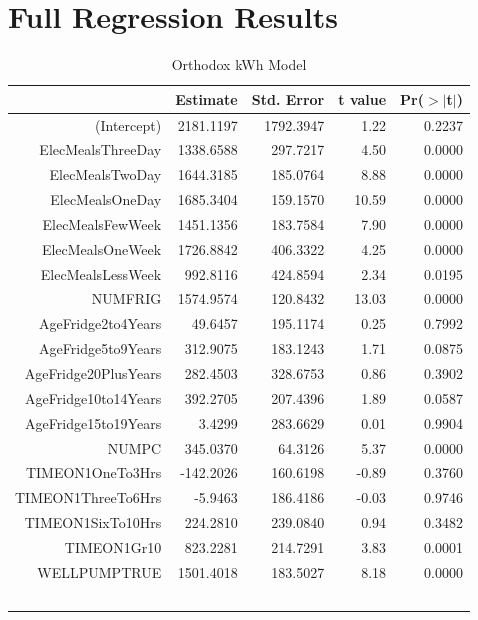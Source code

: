 \documentclass{article}
\begin{document}
\cite{boot}
\nocite{*}
 


\appendix
\section{Full Regression Results}\label{OrthResults}


{\small
\begin{longtable}{rrrrr}
\caption{Orthodox kWh Model} \\ 
  \hline
 & Estimate & Std. Error & t value & Pr($>$$|$t$|$) \\ 
  \hline
(Intercept) & 2181.1197 & 1792.3947 & 1.22 & 0.2237 \\ 
  ElecMealsThreeDay & 1338.6588 & 297.7217 & 4.50 & 0.0000 \\ 
  ElecMealsTwoDay & 1644.3185 & 185.0764 & 8.88 & 0.0000 \\ 
  ElecMealsOneDay & 1685.3404 & 159.1570 & 10.59 & 0.0000 \\ 
  ElecMealsFewWeek & 1451.1356 & 183.7584 & 7.90 & 0.0000 \\ 
  ElecMealsOneWeek & 1726.8842 & 406.3322 & 4.25 & 0.0000 \\ 
  ElecMealsLessWeek & 992.8116 & 424.8594 & 2.34 & 0.0195 \\ 
  NUMFRIG & 1574.9574 & 120.8432 & 13.03 & 0.0000 \\ 
  AgeFridge2to4Years & 49.6457 & 195.1174 & 0.25 & 0.7992 \\ 
  AgeFridge5to9Years & 312.9075 & 183.1243 & 1.71 & 0.0875 \\ 
  AgeFridge20PlusYears & 282.4503 & 328.6753 & 0.86 & 0.3902 \\ 
  AgeFridge10to14Years & 392.2705 & 207.4396 & 1.89 & 0.0587 \\ 
  AgeFridge15to19Years & 3.4299 & 283.6629 & 0.01 & 0.9904 \\ 
  NUMPC & 345.0370 & 64.3126 & 5.37 & 0.0000 \\ 
  TIMEON1OneTo3Hrs & -142.2026 & 160.6198 & -0.89 & 0.3760 \\ 
  TIMEON1ThreeTo6Hrs & -5.9463 & 186.4186 & -0.03 & 0.9746 \\ 
  TIMEON1SixTo10Hrs & 224.2810 & 239.0840 & 0.94 & 0.3482 \\ 
  TIMEON1Gr10 & 823.2281 & 214.7291 & 3.83 & 0.0001 \\ 
  WELLPUMPTRUE & 1501.4018 & 183.5027 & 8.18 & 0.0000 \\ 
$$
\end{longtable}}
\end{document}
